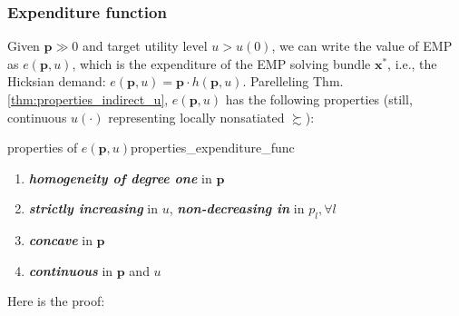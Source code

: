 \subsubsection*{Expenditure function}
Given $\mathbf{p}\gg 0$ and target utility level $u> u(0)$, we can write the value of EMP as $e(\mathbf{p},u)$, which is the expenditure of the EMP solving bundle $\mathbf{x}^*$, i.e., the Hicksian demand: $e(\mathbf{p},u) = \mathbf{p}\cdot h(\mathbf{p},u)$.
Parelleling Thm.\ref{thm:properties_indirect_u}, $e(\mathbf{p},u)$ has the following properties (still, continuous $u(\cdot)$ representing locally nonsatiated $\succsim$):
\begin{theorem}{properties of $e(\mathbf{p},u)$}{properties_expenditure_func}
    \begin{enumerate}
        \item \textit{\textbf{homogeneity of degree one}} in $\mathbf{p}$
        \item \textit{\textbf{strictly increasing}} in $u$, \textit{\textbf{non-decreasing in}} in $p_l,\forall l$
        \item \textit{\textbf{concave}} in $\mathbf{p}$
        \item \textit{\textbf{continuous}} in $\mathbf{p}$ and $u$
    \end{enumerate}
\end{theorem}
Here is the proof:
